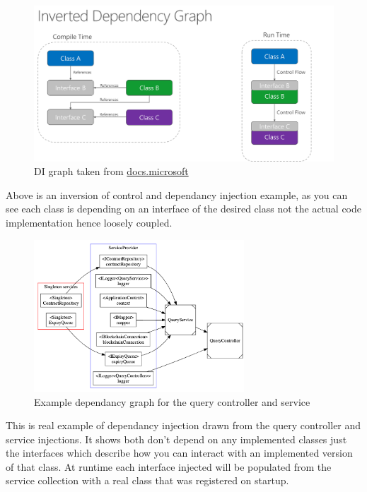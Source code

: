 \begin{figure}[H]
\caption{DI graph taken from \href{https://docs.microsoft.com/en-us/dotnet/architecture/modern-web-apps-azure/architectural-principles#dependency-inversion}{docs.microsoft}}
\centering
\includegraphics[width=\textwidth,height=\textheight,keepaspectratio]{images/patterns/ms-di}
\centering
\end{figure}

Above is an inversion of control and dependancy injection example, as you can see each class is depending on an interface of the desired class not the actual code implementation hence loosely coupled.

\begin{figure}[H]
\caption{Example dependancy graph for the query controller and service}
\centering
\includegraphics[width=0.7\textwidth,height=0.7\textheight,keepaspectratio]{images/patterns/DI-example}
\end{figure}

This is real example of dependancy injection drawn from the query controller and service injections. It shows both don't depend on any implemented classes just the interfaces which describe how you can interact with an implemented version of that class. At runtime each interface injected will be populated from the service collection with a real class that was registered on startup.

